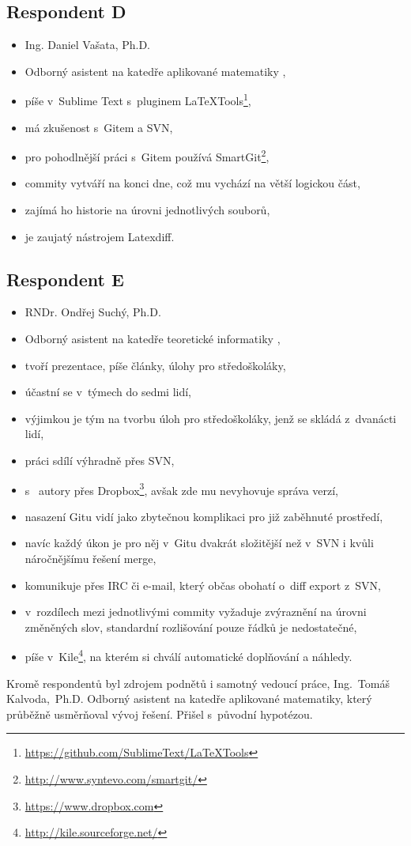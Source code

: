 \subsection{Respondent D}

\begin{itemize}
	\item Ing. Daniel Vašata, Ph.D.
	\item Odborný asistent na katedře aplikované matematiky \cite{kam},
	\item píše v~Sublime Text s~pluginem LaTeXTools\footnote{\url{https://github.com/SublimeText/LaTeXTools}},
	\item má zkušenost s~Gitem a SVN,
	\item pro pohodlnější práci s~Gitem používá SmartGit\footnote{\url{http://www.syntevo.com/smartgit/}},
	\item commity vytváří na konci dne, což mu vychází na větší logickou část,
	\item zajímá ho historie na úrovni jednotlivých souborů,
	\item je zaujatý nástrojem Latexdiff.
\end{itemize}


\subsection{Respondent E}

\begin{itemize}
	\item RNDr. Ondřej Suchý, Ph.D.
	\item Odborný asistent na katedře teoretické informatiky \cite{kti},
	\item tvoří prezentace, píše články, úlohy pro středoškoláky,
	\item účastní se v~týmech do sedmi lidí,
	\item výjimkou je tým na tvorbu úloh pro středoškoláky, jenž se skládá z~dvanácti lidí,
	\item práci sdílí výhradně přes SVN,
	\item s~ autory přes Dropbox\footnote{\url{https://www.dropbox.com}}, avšak zde mu nevyhovuje správa verzí,
	\item nasazení Gitu vidí jako zbytečnou komplikaci pro již zaběhnuté prostředí,
	\item navíc každý úkon je pro něj v~Gitu dvakrát složitější než v~SVN i kvůli náročnějšímu řešení merge,
	\item komunikuje přes IRC či e-mail, který občas obohatí o~diff export z~SVN,
	\item v~rozdílech mezi jednotlivými commity vyžaduje zvýraznění na úrovni změněných slov, standardní rozlišování pouze řádků je nedostatečné,
	\item píše v~Kile\footnote{\url{http://kile.sourceforge.net/}}, na kterém si chválí automatické doplňování a náhledy.
\end{itemize}

Kromě respondentů byl zdrojem podnětů i samotný vedoucí práce, Ing.~Tomáš Kalvoda,~Ph.D. Odborný asistent na katedře aplikované matematiky, který průběžně usměrňoval vývoj řešení. Přišel s~původní hypotézou.